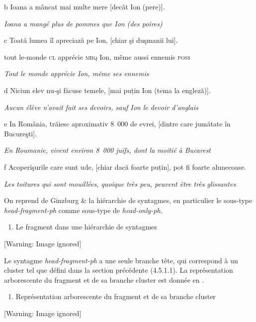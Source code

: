   b  Ioana a mâncat mai multe mere [decât Ion (pere)].

{\itshape
Ioana a mangé plus de pommes que Ion (des poires) } 

  c  Toată lumea îl apreciază pe Ion, [chiar şi duşmanii lui].

    tout le-monde \textsc{cl} apprécie \textsc{mrq} Ion, même aussi ennemis \textsc{poss}

{\itshape
Tout le monde apprécie Ion, même ses ennemis } 

  d  Niciun elev nu-şi făcuse temele, [mai puțin Ion (tema la engleză)].

{\itshape
Aucun élève n'avait fait ses devoirs, sauf Ion le devoir d'anglais } 

  e  In România, trăiesc aproximativ 8~000 de evrei, [dintre care jumătate în Bucureşti].

{\itshape
En Roumanie, vivent environ 8~000 juifs, dont la moitié à Bucarest } 

  f  Acoperişurile care sunt ude, [chiar dacă foarte puțin], pot fi foarte alunecoase.

{\itshape
    Les toitures qui sont mouillées, quoique très peu, peuvent être très glissantes } 

On reprend de Ginzburg \& \citet{Sag2000} la hiérarchie de syntagmes, en particulier le sous-type \textit{head-fragment-ph} comme sous-type de \textit{head-only-ph}. 


\begin{enumerate}
\item Le fragment dans une hiérarchie de syntagmes 


\end{enumerate}
{   [Warning: Image ignored] %
} 

Le syntagme \textit{head-fragment-ph} a une seule branche tête, qui correspond à un cluster tel que défini dans la section précédente (4.5.1.1). La représentation arborescente du fragment et de sa branche cluster est donnée en .


\begin{enumerate}
\item \label{bkm:Ref302430578}Représentation arborescente du fragment et de sa branche cluster 


\end{enumerate}
{   [Warning: Image ignored] %
} 

